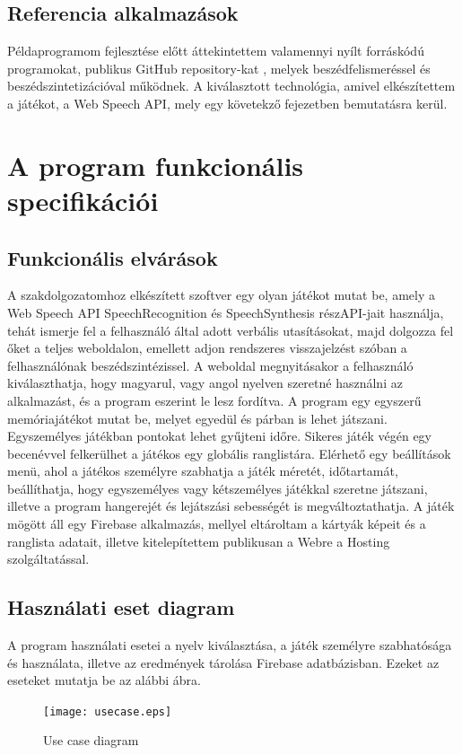 \documentclass[12pt]{report}
\begin{document}
\section{Referencia alkalmazások}
Példaprogramom fejlesztése előtt áttekintettem valamennyi nyílt forráskódú programokat, publikus GitHub repository-kat \cite{web-speech-angular}\cite{pacman}\cite{audio-games}, melyek beszédfelismeréssel és beszédszintetizációval működnek. A kiválasztott technológia, amivel elkészítettem a játékot, a Web Speech API, mely egy követekző fejezetben bemutatásra kerül.

\chapter{A program funkcionális specifikációi}
\section{Funkcionális elvárások}
A szakdolgozatomhoz elkészített szoftver egy olyan játékot mutat be, amely a Web Speech API SpeechRecognition és SpeechSynthesis részAPI-jait használja, tehát ismerje fel a felhasználó által adott verbális utasításokat, majd dolgozza fel őket a teljes weboldalon, emellett adjon rendszeres visszajelzést szóban a felhasználónak beszédszintézissel.
\newline
A weboldal megnyitásakor a felhasználó kiválaszthatja, hogy magyarul, vagy angol nyelven szeretné használni az alkalmazást, és a program eszerint le lesz fordítva.
\newline
A program egy egyszerű memóriajátékot mutat be, melyet egyedül és párban is lehet játszani. Egyszemélyes játékban pontokat lehet gyűjteni időre. Sikeres játék végén egy becenévvel felkerülhet a játékos egy globális ranglistára.
\newline
Elérhető egy beállítások menü, ahol a játékos személyre szabhatja a játék méretét, időtartamát, beállíthatja, hogy egyszemélyes vagy kétszemélyes játékkal szeretne játszani, illetve a program hangerejét és lejátszási sebességét is megváltoztathatja.
\newline
A játék mögött áll egy Firebase alkalmazás, mellyel eltároltam a kártyák képeit és a ranglista adatait, illetve kitelepítettem publikusan a Webre a Hosting szolgáltatással.
\pagebreak
\section{Használati eset diagram}
\noindent
A program használati esetei a nyelv kiválasztása, a játék személyre szabhatósága és használata, illetve az eredmények tárolása Firebase adatbázisban. Ezeket az eseteket mutatja be az alábbi ábra.
\begin{figure}[H]
  \centerline{\texttt{[image: usecase.eps]}}
  \caption{Use case diagram}
\end{figure}
\pagebreak
\end{document}
